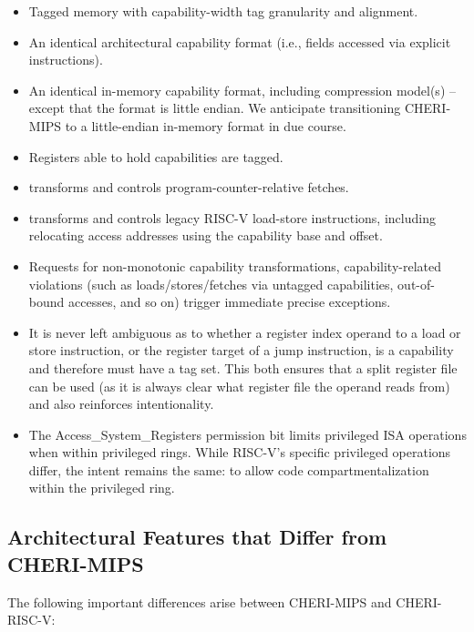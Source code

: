 \begin{itemize}
\item Tagged memory with capability-width tag granularity and alignment.
\item An identical architectural capability format (i.e., fields accessed via
  explicit instructions).
\item An identical in-memory capability format, including compression model(s)
  -- except that the format is little endian.
  We anticipate transitioning CHERI-MIPS to a little-endian in-memory format
  in due course.
\item Registers able to hold capabilities are tagged.
\item \PCC{} transforms and controls program-counter-relative fetches.
\item \DDC{} transforms and controls legacy RISC-V load-store instructions,
  including relocating access addresses using the capability base and offset.
\item Requests for non-monotonic capability transformations,
  capability-related violations (such as loads/stores/fetches via untagged
  capabilities, out-of-bound accesses, and so on) trigger immediate precise
  exceptions.
\item It is never left ambiguous as to whether a register index operand to a
  load or store instruction, or the register target of a jump instruction,
  is a capability and therefore must have a tag set.
  This both ensures that a split register file can be used (as it is always
  clear what register file the operand reads from) and also reinforces
  intentionality.
\item The Access\_System\_Registers permission bit limits privileged ISA
  operations when within privileged rings.
  While RISC-V's specific privileged operations differ, the intent remains the
  same: to allow code compartmentalization within the privileged ring.
\end{itemize}

\subsection{Architectural Features that Differ from CHERI-MIPS}

The following important differences arise between CHERI-MIPS and CHERI-RISC-V:

